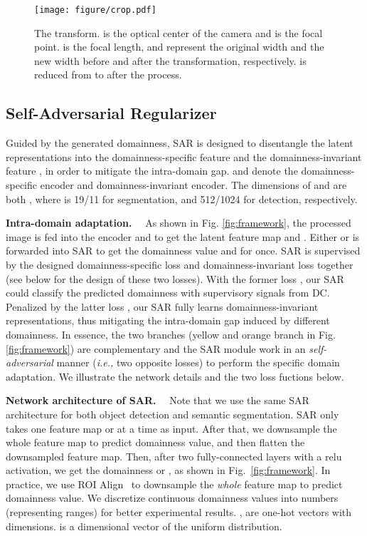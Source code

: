 \documentclass[10pt,journal,compsoc]{IEEEtran}
\renewcommand{\paragraph}[1]{\noindent\textbf{#1}~~}
\begin{document}
\begin{figure}[!t]
\centering
\texttt{[image: figure/crop.pdf]}
\caption{The  transform.  is the optical center of the camera and  is the focal point.  is the focal length,  and  represent the original width and the new width before and after the transformation, respectively.   is reduced from  to  after the process. }
\label{fig:crop}
\end{figure}
\vspace{-2mm}


\subsection{Self-Adversarial Regularizer}
\label{sec: sar}

Guided by the generated domainness, SAR is designed to disentangle the latent representations into the domainness-specific feature  and the domainness-invariant feature , in order to mitigate the intra-domain gap. 
 and  denote the domainness-specific encoder and domainness-invariant encoder. 
The dimensions of  and  are both , where  is 19/11 for segmentation, and 512/1024 for detection, respectively.

\paragraph{Intra-domain adaptation.}
As shown in Fig. \ref{fig:framework}, the processed image  is fed into the encoder  and  to get the latent feature map  and . Either  or   is forwarded into SAR to get the domainness value  and  for once.  
SAR is supervised by the designed domainness-specific loss  and  domainness-invariant loss  together (see below for the design of these two losses). With the former loss , our SAR could classify the predicted domainness  with supervisory signals  from DC.  Penalized by the latter loss , our SAR fully learns domainness-invariant representations, thus mitigating the intra-domain gap induced by different domainness. 
In essence, the two branches (yellow and orange branch in Fig. \ref{fig:framework}) are complementary and the SAR module work in an \textit{self-adversarial} manner (\emph{i.e.,} two opposite losses) to perform the specific domain adaptation. We illustrate the network details and the two loss fuctions below.


\paragraph{Network architecture of SAR.}
Note that we use the same SAR architecture for both object detection and semantic segmentation. SAR only takes one feature map  or  at a time as input. After that, we downsample the whole feature map to predict domainness value, and then flatten the downsampled feature map. Then, after two fully-connected layers with a relu activation, we get the domainness  or , as shown in Fig.~\ref{fig:framework}. In practice, we use ROI Align~\cite{mask-rcnn} to downsample the \emph{whole} feature map to predict domainness value.  We discretize continuous domainness values into  numbers (representing  ranges)  for better experimental results.
,  are one-hot vectors with  dimensions.  is a  dimensional vector of the uniform distribution.
\end{document}

